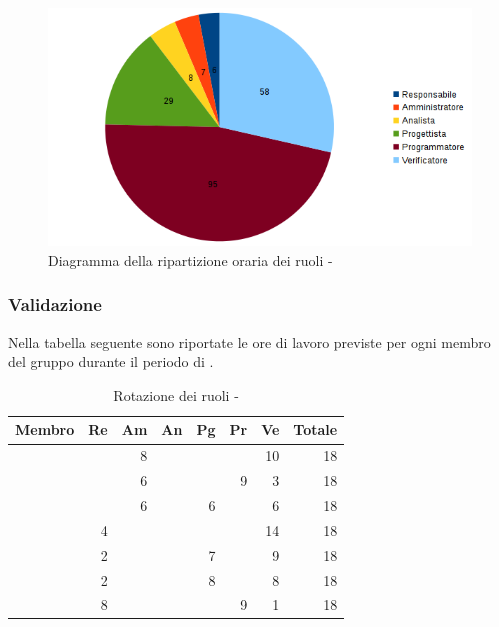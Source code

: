 \documentclass[12pt,a4paper]{article}
\begin{document}
\begin{center}
	\begin{figure}[H]
		\centering
		\includegraphics[width=\textwidth]{../img/diagrammaTortaProgettazioneDettaglioCodificaTotaleOre.png}
		\caption{Diagramma della ripartizione oraria dei ruoli - \FPDC{}}
	\end{figure}
\end{center}

\newpage
\subsubsection{Validazione}

Nella tabella seguente sono riportate le ore di lavoro previste per ogni membro del gruppo durante il periodo di \FV.

\begin{table}[H]
	\begin{center}
		\begin{tabular}{l r r r r r r r}
			\toprule
			\textbf{Membro}	&	\textbf{Re}	&	\textbf{Am}	& \textbf{An} & \textbf{Pg} & \textbf{Pr} & \textbf{Ve} & \textbf{Totale}\\
			\midrule
			\midrule
			\IB{} & & 8 & & & & 10 & 18 \\
			\midrule
			\AB{} & & 6 & & & 9 & 3 & 18 \\
			\midrule
			\NDC{} & & 6 & & 6 & & 6 & 18 \\
			\midrule
			\TP{} & 4 & & & & &14 & 18 \\
			\midrule
			\WS{} & 2 & & & 7 & & 9 & 18 \\
			\midrule
			\AVE{} & 2 & & & 8 & & 8 & 18 \\
			\midrule
			\AVI{} & 8 & & & & 9 & 1 & 18 \\
			\bottomrule
		\end{tabular}
		\caption{Rotazione dei ruoli - \FVV{}}
	\end{center}
\end{table}
\end{document}
